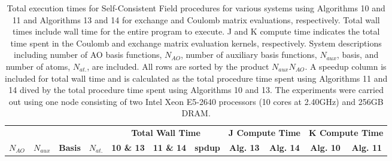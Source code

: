 \begingroup
\renewcommand{\arraystretch}{0.6}
\begin{table}[H]
\footnotesize
\centering
\renewcommand{\baselinestretch}{1}
\caption{Total execution times for Self-Consistent Field procedures for various systems using Algorithms 10 and 11 and Algorithms 13 and 14 for
exchange and Coulomb matrix evaluations, respectively. Total wall times include 
wall time for the entire program to execute. J and K compute time indicates the total time spent in the Coulomb and exchange matrix
evaluation kernels, respectively. System descriptions including number of AO basis functions, $N_{AO}$, number of auxiliary basis functions,
$N_{aux}$, basis, and number of atoms, $N_{at.}$, are included. All rows are sorted by the product $N_{aux}N_{AO}$.
A speedup column is included for total wall time and is calculated as the total procedure time spent using Algorithms 11 and 14 dived by 
the total procedure time spent using Algorithms 10 and 13. The experiments were carried out using one node consisting
of two Intel Xeon E5-2640 processors (10 cores at 2.40GHz) and 256GB DRAM.
\label{tbl:practical_speedups}}
\begin{tabular}{lrrrrrrrrrr}
  \multicolumn{1}{c}{\textbf{}} 
& \multicolumn{1}{c}{\textbf{}} 
& \multicolumn{1}{c}{\textbf{}} 
& \multicolumn{1}{c}{\textbf{}} 
& \multicolumn{3}{c}{\textbf{Total Wall Time}}  
& \multicolumn{2}{c}{\textbf{J Compute Time}}  
& \multicolumn{2}{c}{\textbf{K Compute Time}} \\ 
\cline{5-7}
\cline{8-9}
\cline{10-11}
  \multicolumn{1}{c}{\textbf{$N_{AO}$}} 
& \multicolumn{1}{c}{\textbf{$N_{aux}$}} 
& \multicolumn{1}{c}{\textbf{Basis}} 
& \multicolumn{1}{c}{\textbf{$N_{at.}$}} 
& \multicolumn{1}{c}{\textbf{10 \& 13}} 
& \multicolumn{1}{c}{\textbf{11 \& 14}} 
& \multicolumn{1}{c}{\textbf{spdup}} 
& \multicolumn{1}{c}{\textbf{Alg. 13}} 
& \multicolumn{1}{c}{\textbf{Alg. 14}} 
& \multicolumn{1}{c}{\textbf{Alg. 10}} 
& \multicolumn{1}{c}{\textbf{Alg. 11}} \\ 
\hline


\end{tabular}
\end{table}
